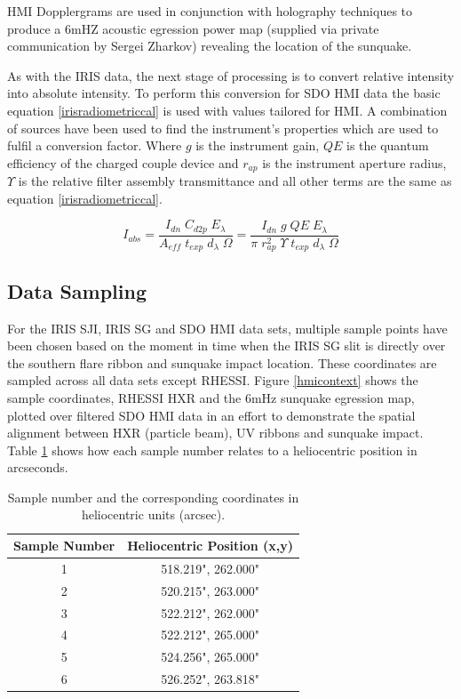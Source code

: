 HMI Dopplergrams are used in conjunction with holography techniques to produce a 6mHZ acoustic egression power map (supplied via private communication by Sergei Zharkov) revealing the location of the sunquake. 

As with the IRIS data, the next stage of processing is to convert relative intensity into absolute intensity. To perform this conversion for SDO HMI data the basic equation \ref{irisradiometriccal} is used with values tailored for HMI. A combination of sources \citep{2012SoPh..275...41B, 2012SoPh..275..285C} have been used to find the instrument's properties which are used to fulfil a conversion factor. Where $g$ is the instrument gain, $QE$ is the quantum efficiency of the charged couple device and $r_{ap}$ is the instrument aperture radius, $\Upsilon$ is the relative filter assembly transmittance and all other terms are the same as equation \ref{irisradiometriccal}.


\begin{equation}\label{hmiradiometriccal}
I_{abs} = \frac{I_{dn} \; C_{d2p} \; E_{\lambda}}{A_{eff} \; t_{exp} \; d_{\lambda} \; \Omega} 
        = \frac{I_{dn} \; g \; QE \; E_{\lambda}}{\pi \; r_{ap}^{2} \; \Upsilon \; t_{exp} \; d_{\lambda} \; \Omega} 
\end{equation}


\subsection{Data Sampling}
For the IRIS SJI, IRIS SG and SDO HMI data sets, multiple sample points have been chosen based on the moment in time when the IRIS SG slit is directly over the southern flare ribbon and sunquake impact location. These coordinates are sampled across all data sets except RHESSI. Figure \ref{hmicontext} shows the sample coordinates, RHESSI HXR and the 6mHz sunquake egression map, plotted over filtered SDO HMI data in an effort to demonstrate the spatial alignment between HXR (particle beam), UV ribbons and sunquake impact. Table \ref{coordtab} shows how each sample number relates to a heliocentric position in arcseconds.


\begin{table}[h]

\begin{tabular}{|c|c|}
\hline
Sample Number & Heliocentric Position (x,y)\\
\hline
1 & 518.219", 262.000"\\
2 & 520.215", 263.000"\\
3 & 522.212", 262.000"\\
4 & 522.212", 265.000"\\
5 & 524.256", 265.000"\\
6 & 526.252", 263.818"\\
\hline
\end{tabular}
\caption{Sample number and the corresponding coordinates in heliocentric units (arcsec).}\label{coordtab}
\end{table}

